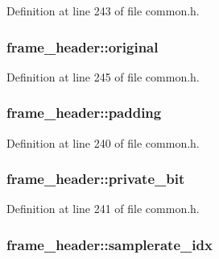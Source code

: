 Definition at line 243 of file common.\+h.

\subsubsection[{\texorpdfstring{original}{original}}]{ frame\+\_\+header\+::original}\hypertarget{structframe__header_abfbb3dfe82609ea7ac3231a6f8ae7ea6}{}\label{structframe__header_abfbb3dfe82609ea7ac3231a6f8ae7ea6}


Definition at line 245 of file common.\+h.

\subsubsection[{\texorpdfstring{padding}{padding}}]{ frame\+\_\+header\+::padding}\hypertarget{structframe__header_a7619c413891eee701508eade187f659d}{}\label{structframe__header_a7619c413891eee701508eade187f659d}


Definition at line 240 of file common.\+h.

\subsubsection[{\texorpdfstring{private\+\_\+bit}{private_bit}}]{ frame\+\_\+header\+::private\+\_\+bit}\hypertarget{structframe__header_a1f602c0aa4f7a28ba1bc48e321037baa}{}\label{structframe__header_a1f602c0aa4f7a28ba1bc48e321037baa}


Definition at line 241 of file common.\+h.

\subsubsection[{\texorpdfstring{samplerate\+\_\+idx}{samplerate_idx}}]{ frame\+\_\+header\+::samplerate\+\_\+idx}\hypertarget{structframe__header_aeaaf556b174d5d6c8d719f34d4f9154e}{}\label{structframe__header_aeaaf556b174d5d6c8d719f34d4f9154e}


